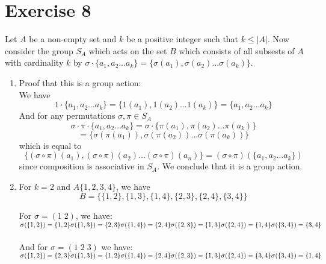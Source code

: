 \documentclass{article}
\begin{document}
    \section*{Exercise 8}
    Let $A$ be a non-empty set and $k$ be a positive integer
    such that $k \leqslant |A|$.
    Now consider the group $S_A$ which acts on the set $B$
    which consists of all subsests of $A$ with cardinality $k$
    by $\sigma \cdot \{a_1, a_2 \dots a_k\} =
    \{\sigma(a_1), \sigma(a_2) \dots \sigma(a_k)\}$. \\
    \begin{enumerate}[label=\textbf{\alph*.}]
        \item 
            Proof that this is a group action: \\
            We have 
            \[ 1 \cdot \{a_1, a_2 \dots a_k\}
            = \{1(a_1), 1(a_2) \dots 1(a_k)\}
            = \{a_1, a_2 \dots a_k\} \]
            And for any permutations $\sigma, \pi \in S_A$
            \[ \sigma \cdot \pi \cdot \{a_1, a_2 \dots a_k\}
            = \sigma \cdot \{\pi(a_1), \pi(a_2) \dots \pi(a_k)\} \]
            \[ = \{\sigma(\pi(a_1)), \sigma(\pi(a_2))
            \dots \sigma(\pi(a_k))\} \]
            which is equal to
            \[ \{(\sigma \circ \pi)(a_1), (\sigma \circ \pi)(a_2)
            \dots (\sigma \circ \pi)(a_n)\}
            = (\sigma \circ \pi)(\{a_1, a_2 \dots a_k\}) \] 
            since composition is associative in $S_A$. 
            We conclude that it is a group action.
        \item 
            For $k = 2$ and $A \{1, 2, 3, 4\}$,
            we have
            \[B = \{\{1, 2\}, \{1, 3\}, \{1, 4\}, \{2, 3\}, \{2, 4\},
            \{3, 4\}\}\]
            \begin{multicols}{2}
                For $\sigma = (1\;2)$, we have: \\
                $\sigma(\{1, 2\}) = \{1, 2\} \\
                \sigma(\{1, 3\}) = \{2, 3\} \\
                \sigma(\{1, 4\}) = \{2, 4\} \\
                \sigma(\{2, 3\}) = \{1, 3\} \\
                \sigma(\{2, 4\}) = \{1, 4\} \\
                \sigma(\{3, 4\}) = \{3, 4\}$ \\
                \columnbreak \\
                And for $\sigma = (1\;2\;3)$ we have: \\
                $\sigma(\{1, 2\}) = \{2, 3\} \\
                \sigma(\{1, 3\}) = \{1, 2\} \\
                \sigma(\{1, 4\}) = \{2, 4\} \\
                \sigma(\{2, 3\}) = \{1, 3\} \\
                \sigma(\{2, 4\}) = \{3, 4\} \\
                \sigma(\{3, 4\}) = \{1, 4\}$ \\
            \end{multicols}
    \end{enumerate}
\end{document}
